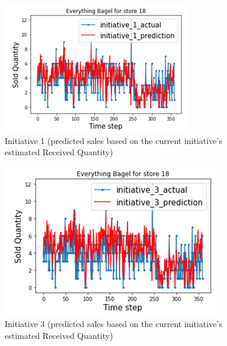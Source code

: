 \begin{figure}[ht]
    \centering
    \includegraphics[width = 0.6\linewidth]{figures/section5.png}
    \caption{Initiative 1 (predicted sales based on the current initiative’s estimated Received Quantity) }
\end{figure}


\begin{figure}[ht]
    \centering
    \includegraphics[width = 0.6\linewidth]{figures/section6.png}
    \caption{Initiative 3 (predicted sales based on the current initiative’s estimated Received Quantity) }
\end{figure}

\clearpage